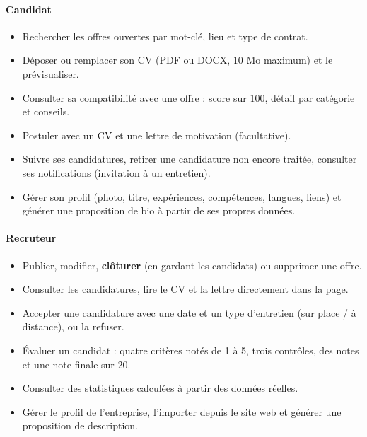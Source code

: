 \documentclass[12pt,a4paper]{report}
\begin{document}
\paragraph{Candidat}
\begin{itemize}
  \item Rechercher les offres ouvertes par mot-clé, lieu et type de contrat.
  \item Déposer ou remplacer son CV (PDF ou DOCX, 10 Mo maximum) et le prévisualiser.
  \item Consulter sa compatibilité avec une offre : score sur 100, détail par catégorie et conseils.
  \item Postuler avec un CV et une lettre de motivation (facultative).
  \item Suivre ses candidatures, retirer une candidature non encore traitée, consulter ses notifications (invitation à un entretien).
  \item Gérer son profil (photo, titre, expériences, compétences, langues, liens) et générer une proposition de bio à partir de ses propres données.
\end{itemize}

\paragraph{Recruteur}
\begin{itemize}
  \item Publier, modifier, \textbf{clôturer} (en gardant les candidats) ou supprimer une offre.
  \item Consulter les candidatures, lire le CV et la lettre directement dans la page.
  \item Accepter une candidature avec une date et un type d'entretien (sur place / à distance), ou la refuser.
  \item Évaluer un candidat : quatre critères notés de 1 à 5, trois contrôles, des notes et une note finale sur 20.
  \item Consulter des statistiques calculées à partir des données réelles.
  \item Gérer le profil de l'entreprise, l'importer depuis le site web et générer une proposition de description.
\end{itemize}
\end{document}
